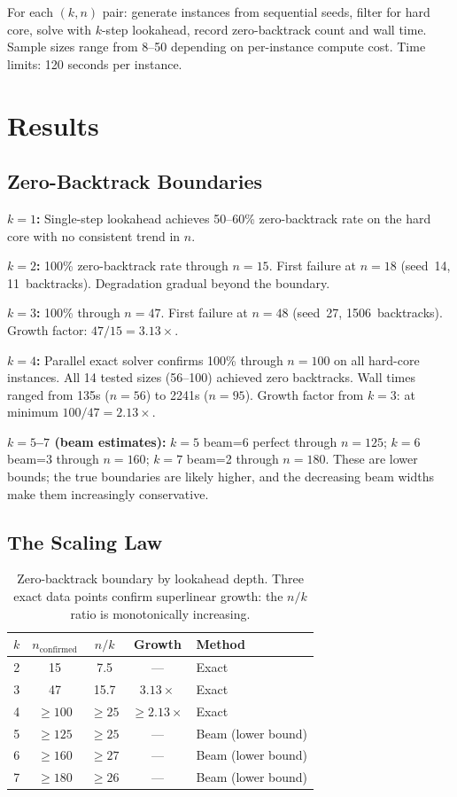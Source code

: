 \documentclass[11pt,a4paper]{article}
\begin{document}
For each $(k, n)$ pair: generate instances from sequential seeds, filter for hard core, solve with $k$-step lookahead, record zero-backtrack count and wall time. Sample sizes range from 8--50 depending on per-instance compute cost. Time limits: 120 seconds per instance.

\section{Results}

\subsection{Zero-Backtrack Boundaries}

\textbf{$k = 1$:} Single-step lookahead achieves 50--60\% zero-backtrack rate on the hard core with no consistent trend in $n$.

\textbf{$k = 2$:} 100\% zero-backtrack rate through $n = 15$. First failure at $n = 18$ (seed~14, 11~backtracks). Degradation gradual beyond the boundary.

\textbf{$k = 3$:} 100\% through $n = 47$. First failure at $n = 48$ (seed~27, 1506~backtracks). Growth factor: $47/15 = 3.13\times$.

\textbf{$k = 4$:} Parallel exact solver confirms 100\% through $n = 100$ on all hard-core instances. All 14 tested sizes (56--100) achieved zero backtracks. Wall times ranged from 135s ($n = 56$) to 2241s ($n = 95$). Growth factor from $k = 3$: at minimum $100/47 = 2.13\times$.

\textbf{$k = 5$--$7$ (beam estimates):} $k = 5$ beam=6 perfect through $n = 125$; $k = 6$ beam=3 through $n = 160$; $k = 7$ beam=2 through $n = 180$. These are lower bounds; the true boundaries are likely higher, and the decreasing beam widths make them increasingly conservative.

\subsection{The Scaling Law}

\begin{table}[h]
\centering
\begin{tabular}{@{}ccccl@{}}
\toprule
$k$ & $n_{\mathrm{confirmed}}$ & $n/k$ & Growth & Method \\
\midrule
2 & 15 & 7.5  & ---       & Exact \\
3 & 47 & 15.7 & $3.13\times$ & Exact \\
4 & ${\geq}100$ & ${\geq}25$ & ${\geq}2.13\times$ & Exact \\
5 & ${\geq}125$ & ${\geq}25$ & ---       & Beam (lower bound) \\
6 & ${\geq}160$ & ${\geq}27$ & ---       & Beam (lower bound) \\
7 & ${\geq}180$ & ${\geq}26$ & ---       & Beam (lower bound) \\
\bottomrule
\end{tabular}
\caption{Zero-backtrack boundary by lookahead depth. Three exact data points confirm superlinear growth: the $n/k$ ratio is monotonically increasing.}
\label{tab:scaling}
\end{table}
\end{document}
